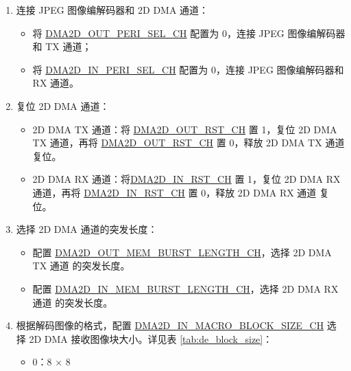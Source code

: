 \documentclass[main\_\_CN.tex]{subfiles}
\begin{document}
\begin{enumerate}
\begin{enumerate}
\begin{itemize}
\begin{longtable}{ | L{4cm} | L{3cm} | L{3cm} | }
        GRAY &  8 的倍数 &  8 的倍数  \\ \hline
        \end{longtable}
        \end{itemize}
        \item 连接 JPEG 图像编解码器和 2D DMA 通道：
        \begin{itemize}
            \item 将 \hyperref[fielddesc:DMA2DOUTPERISELCHN]{DMA2D\_OUT\_PERI\_SEL\_CH} 配置为 0，连接 JPEG 图像编解码器和 TX 通道；
            \item 将 \hyperref[fielddesc:DMA2DINPERISELCHN]{DMA2D\_IN\_PERI\_SEL\_CH} 配置为 0，连接 JPEG 图像编解码器和 RX 通道。
        \end{itemize}
        \item 复位 2D DMA 通道：
        \begin{itemize}
            \item 2D DMA TX 通道：将 \hyperref[fielddesc:DMA2DOUTRSTCHN]{DMA2D\_OUT\_RST\_CH} 置 1，复位 2D DMA TX 通道，再将 \hyperref[fielddesc:DMA2DOUTRSTCHN]{DMA2D\_OUT\_RST\_CH} 置 0，释放 2D DMA TX 通道 复位。
            \item 2D DMA RX 通道：将\hyperref[fielddesc:DMA2DINRSTCHN]{DMA2D\_IN\_RST\_CH} 置 1，复位 2D DMA RX 通道，再将 \hyperref[fielddesc:DMA2DINRSTCHN]{DMA2D\_IN\_RST\_CH} 置 0，释放 2D DMA RX 通道 复位。
        \end{itemize}
        \item 选择 2D DMA 通道的突发长度：
        \begin{itemize}
            \item 配置 \hyperref[fielddesc:DMA2DOUTMEMBURSTLENGTHCHN]{DMA2D\_OUT\_MEM\_BURST\_LENGTH\_CH}，选择 2D DMA TX 通道 的突发长度。
            \item 配置 \hyperref[fielddesc:DMA2DINMEMBURSTLENGTHCHN]{DMA2D\_IN\_MEM\_BURST\_LENGTH\_CH}，选择 2D DMA RX 通道 的突发长度。
        \end{itemize}
        \item 根据解码图像的格式，配置 \hyperref[fielddesc:DMA2DINMACROBLOCKSIZECHN]{DMA2D\_IN\_MACRO\_BLOCK\_SIZE\_CH} 选择 2D DMA 接收图像块大小。详见表 \ref{tab:de_block_size}：
        \begin{itemize}
            \item 0：8 × 8

\end{itemize}
\end{enumerate}
\end{enumerate}
\end{document}
